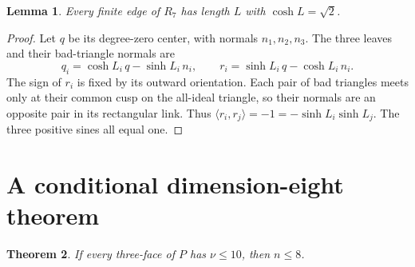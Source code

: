 \documentclass[11pt]{article}
\newtheorem{theorem}{Theorem}[section]
\newtheorem{lemma}[theorem]{Lemma}
\theoremstyle{definition}\newtheorem{definition}[theorem]{Definition}
\theoremstyle{remark}\newtheorem{remark}[theorem]{Remark}
\newcommand{\ip}[2]{\langle #1,#2\rangle}
\newcommand{\nuu}{\nu}
\newcommand{\Rseven}{R_7}
\begin{document}
\begin{lemma}\label{lem:shortedge}
Every finite edge of \(\Rseven\) has length \(L\) with
\(\cosh L=\sqrt2\).
\end{lemma}
\begin{proof}
Let \(q\) be its degree-zero center, with normals \(n_1,n_2,n_3\).
The three leaves and their bad-triangle normals are
\[
 q_i=\cosh L_i\,q-\sinh L_i\,n_i,\qquad
 r_i=\sinh L_i\,q-\cosh L_i\,n_i.
\]
The sign of \(r_i\) is fixed by its outward orientation. Each pair
of bad triangles meets only at their common cusp on the all-ideal
triangle, so their normals are an opposite pair in its rectangular
link. Thus \(\ip{r_i}{r_j}=-1=-\sinh L_i\sinh L_j\).
The three positive sines all equal one.
\end{proof}

\section{A conditional dimension-eight theorem}
\begin{theorem}\label{thm:small8}
If every three-face of \(P\) has \(\nuu\le10\), then \(n\le8\).
\end{theorem}
\end{document}
